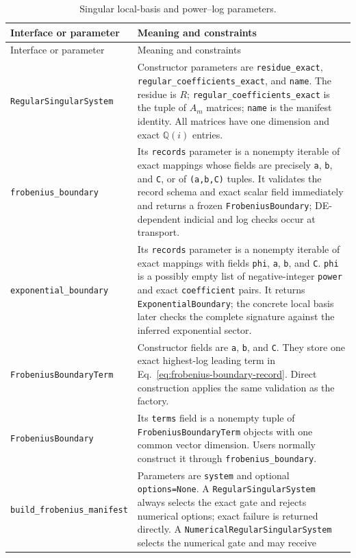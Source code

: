 \documentclass[11pt]{article}
\begin{document}
\small
\begin{longtable}{L{0.36\textwidth}L{0.58\textwidth}}
\caption{Singular local-basis and power--log parameters.}\label{tab:frobenius-api}\\
\toprule
Interface or parameter & Meaning and constraints \\
\midrule
\endfirsthead
\toprule
Interface or parameter & Meaning and constraints \\
\midrule
\endhead
\texttt{RegularSingularSystem} & Constructor parameters are \texttt{residue\_exact},
\texttt{regular\_coefficients\_exact}, and \texttt{name}.  The residue is $R$;
\texttt{regular\_coefficients\_exact} is the tuple of $A_m$ matrices; \texttt{name} is the
manifest identity.  All matrices have one dimension and exact $\mathbb Q(i)$ entries. \\
\texttt{frobenius\_boundary} & Its \texttt{records} parameter is a nonempty iterable of
exact mappings whose fields are precisely \texttt{a}, \texttt{b}, and \texttt{C}, or of
\texttt{(a,b,C)} tuples.  It validates the record schema and exact scalar field immediately
and returns a frozen
\texttt{FrobeniusBoundary}; DE-dependent indicial and log checks occur at transport. \\
\texttt{exponential\_boundary} & Its \texttt{records} parameter is a nonempty iterable of
exact mappings with fields \texttt{phi}, \texttt{a}, \texttt{b}, and \texttt{C}.
\texttt{phi} is a possibly empty list of negative-integer \texttt{power} and exact
\texttt{coefficient} pairs.  It returns \texttt{ExponentialBoundary}; the concrete local
basis later checks the complete signature against the inferred exponential sector. \\
\texttt{FrobeniusBoundaryTerm} & Constructor fields are \texttt{a}, \texttt{b}, and
\texttt{C}.  They store one exact highest-log leading term in
Eq.~\eqref{eq:frobenius-boundary-record}.  Direct construction applies the same validation
as the factory. \\
\texttt{FrobeniusBoundary} & Its \texttt{terms} field is a nonempty tuple of
\texttt{FrobeniusBoundaryTerm} objects with one common vector dimension.  Users normally
construct it through \texttt{frobenius\_boundary}. \\
\texttt{build\_frobenius\_manifest} & Parameters are \texttt{system} and optional
\texttt{options=None}.  A \texttt{RegularSingularSystem} always selects the exact gate and
rejects numerical options; exact failure is returned directly.  A
\texttt{NumericalRegularSingularSystem} selects the numerical gate and may receive

\end{longtable}
\end{document}
